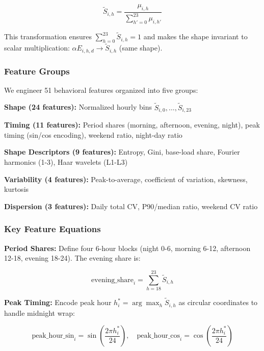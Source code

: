 \documentclass[11pt,a4paper]{article}
\begin{document}
\begin{equation}
\tilde{S}_{i,h} = \frac{\mu_{i,h}}{\sum_{h'=0}^{23} \mu_{i,h'}}
\label{eq:shape_normalization}
\end{equation}

This transformation ensures $\sum_{h=0}^{23} \tilde{S}_{i,h} = 1$ and makes the shape invariant to scalar multiplication: $\alpha E_{i,h,d} \rightarrow \tilde{S}_{i,h}$ (same shape).

\subsubsection{Feature Groups}

We engineer 51 behavioral features organized into five groups:

\textbf{Shape (24 features):} Normalized hourly bins $\tilde{S}_{i,0}, \ldots, \tilde{S}_{i,23}$

\textbf{Timing (11 features):} Period shares (morning, afternoon, evening, night), peak timing (sin/cos encoding), weekend ratio, night-day ratio

\textbf{Shape Descriptors (9 features):} Entropy, Gini, base-load share, Fourier harmonics (1-3), Haar wavelets (L1-L3)

\textbf{Variability (4 features):} Peak-to-average, coefficient of variation, skewness, kurtosis

\textbf{Dispersion (3 features):} Daily total CV, P90/median ratio, weekend CV ratio

\subsubsection{Key Feature Equations}

\textbf{Period Shares:} Define four 6-hour blocks (night 0-6, morning 6-12, afternoon 12-18, evening 18-24). The evening share is:

\begin{equation}
\text{evening\_share}_i = \sum_{h=18}^{23} \tilde{S}_{i,h}
\end{equation}

\textbf{Peak Timing:} Encode peak hour $h^*_i = \arg\max_h \tilde{S}_{i,h}$ as circular coordinates to handle midnight wrap:

\begin{equation}
\text{peak\_hour\_sin}_i = \sin\left(\frac{2\pi h^*_i}{24}\right), \quad
\text{peak\_hour\_cos}_i = \cos\left(\frac{2\pi h^*_i}{24}\right)
\end{equation}
\end{document}
